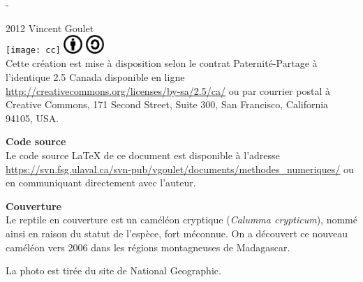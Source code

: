 

\cleardoublepage

\begin{adjustwidth*}{13.1mm}{-72mm}
  \sffamily
  \raggedright
  \vspace*{5mm}
  \thetitle \\
  \vspace*{3cm}
  \theauthor \\
  \vspace*{\fill}
  \thedate
\end{adjustwidth*}
\clearpage

\begingroup
\calccentering{\unitlength}
\begin{adjustwidth*}{\unitlength}{-\unitlength}
  \small
  \setlength{\parindent}{0pt}
  \setlength{\parskip}{\baselineskip}

  {\textcopyright} 2012 Vincent Goulet \\

  \texttt{[image: cc]}\;%
  \includegraphics[height=7mm,keepaspectratio=true]{by}\;%
  \includegraphics[height=7mm,keepaspectratio=true]{sa} \\
  Cette création est mise à disposition selon le contrat
  Paternité-Partage à l'identique 2.5 Canada disponible en ligne
  \url{http://creativecommons.org/licenses/by-sa/2.5/ca/} ou par
  courrier postal à Creative Commons, 171 Second Street, Suite 300,
  San Francisco, California 94105, USA.

  \textbf{Code source} \\
  Le code source {\LaTeX} de ce document est disponible à l'adresse
    \url{https://svn.fsg.ulaval.ca/svn-pub/vgoulet/documents/methodes_numeriques/}
  ou en communiquant directement avec l'auteur.

  \textbf{Couverture} \\
  Le reptile en couverture est un caméléon cryptique (\emph{Calumma
    crypticum}), nommé ainsi en raison du statut de l'espèce, fort
  méconnue. On a découvert ce nouveau caméléon vers 2006 dans les
  régions montagneuses de Madagascar.

  La photo est tirée du site de National Geographic.
\end{adjustwidth*}
\endgroup

\clearpage

